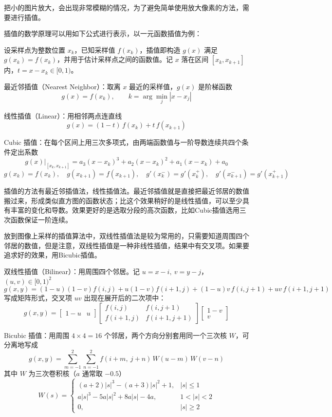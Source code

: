 把小的图片放大，会出现非常模糊的情况，为了避免简单使用放大像素的方法，需要进行插值。

插值的数学原理可以用如下公式进行表示，以一元函数插值为例：

设采样点为整数位置 $x_k$，已知采样值 $f(x_k)$，插值即构造 $g(x)$ 满足 $g(x_k)=f(x_k)$，并用于估计采样点之间的函数值。记 $x$ 落在区间 $[x_k,x_{k+1}]$ 内，$t=x-x_k\in[0,1)$。

最近邻插值（Nearest Neighbor）：取离 $x$ 最近的采样值，$g(x)$ 是阶梯函数
\[
g(x)=f(x_k),\qquad k=\arg\min_{j}|x-x_j|
\]

线性插值（Linear）：用相邻两点连直线
\[
g(x)=(1-t)\,f(x_k)+t\,f(x_{k+1})
\]

Cubic 插值：在每个区间上用三次多项式，由两端函数值与一阶导数连续共四个条件定出系数
\[
g(x)\big|_{[x_k,x_{k+1}]}=a_3(x-x_k)^3+a_2(x-x_k)^2+a_1(x-x_k)+a_0
\]
\[
g(x_k)=f(x_k),\quad g(x_{k+1})=f(x_{k+1}),\quad g'(x_k^-)=g'(x_k^+),\quad g'(x_{k+1}^-)=g'(x_{k+1}^+)
\]

插值的方法有最近邻插值法，线性插值法。最近邻插值就是直接把最近邻居的数值搬过来，形成类似直方图的函数状态；比这个效果稍好的是线性插值，可以至少具有丰富的变化和导数。效果更好的是选取分段的高次函数，比如Cubic插值选用三次函数保证一阶连续。

放到图像上采样的插值算法中，双线性插值法是较为常用的，只需要知道周围四个邻居的数值，但是注意，双线性插值是一种非线性插值，结果中有交叉项。如果要追求好的效果，用Bicubic插值。

双线性插值（Bilinear）：用周围四个邻居。记 $u=x-i,\ v=y-j$，$(u,v)\in[0,1)^2$
\[
g(x,y)=(1-u)(1-v)f(i,j)+u(1-v)f(i+1,j)+(1-u)v\,f(i,j+1)+uv\,f(i+1,j+1)
\]
写成矩阵形式，交叉项 $uv$ 出现在展开后的二次项中：
\[
g(x,y)=
\begin{bmatrix}1-u & u\end{bmatrix}
\begin{bmatrix}f(i,j) & f(i,j+1)\\ f(i+1,j) & f(i+1,j+1)\end{bmatrix}
\begin{bmatrix}1-v\\ v\end{bmatrix}
\]

Bicubic 插值：用周围 $4\times4=16$ 个邻居，两个方向分别套用同一个三次核 $W$，可分离地写成
\[
g(x,y)=\sum_{m=-1}^{2}\sum_{n=-1}^{2} f(i+m,\ j+n)\,W(u-m)\,W(v-n)
\]
其中 $W$ 为三次卷积核（$a$ 通常取 $-0.5$）
\[
W(s)=
\begin{cases}
(a+2)|s|^3-(a+3)|s|^2+1, & |s|\le 1\\[2pt]
a|s|^3-5a|s|^2+8a|s|-4a, & 1<|s|<2\\[2pt]
0, & |s|\ge 2
\end{cases}
\]

